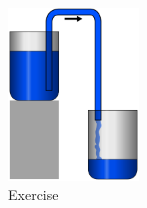 \documentclass[12pt]{article}
\begin{document}
\begin{figure}[h!]
  \begin{center}
    \includegraphics[height=1.8in]{images/Syphon.png}
    \caption{Exercise \theexample }
    \label{3}
  \end{center}
\end{figure}
\end{document}
